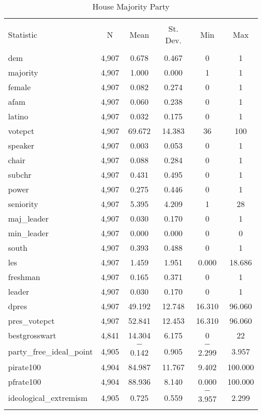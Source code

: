 \documentclass[12pt]{article}
\begin{document}
\begin{table}[ht] \centering 
	\caption{House Majority Party} 
	\label{} 
	\begin{tabular}{@{\extracolsep{5pt}}lccccc} 
		\\[-1.8ex]\hline 
		\hline \\[-1.8ex] 
		Statistic & \multicolumn{1}{c}{N} & \multicolumn{1}{c}{Mean} & \multicolumn{1}{c}{St. Dev.} & \multicolumn{1}{c}{Min} & \multicolumn{1}{c}{Max} \\ 
		\hline \\[-1.8ex] 
		dem & 4,907 & 0.678 & 0.467 & 0 & 1 \\ 
		majority & 4,907 & 1.000 & 0.000 & 1 & 1 \\ 
		female & 4,907 & 0.082 & 0.274 & 0 & 1 \\ 
		afam & 4,907 & 0.060 & 0.238 & 0 & 1 \\ 
		latino & 4,907 & 0.032 & 0.175 & 0 & 1 \\ 
		votepct & 4,907 & 69.672 & 14.383 & 36 & 100 \\ 
		speaker & 4,907 & 0.003 & 0.053 & 0 & 1 \\ 
		chair & 4,907 & 0.088 & 0.284 & 0 & 1 \\ 
		subchr & 4,907 & 0.431 & 0.495 & 0 & 1 \\ 
		power & 4,907 & 0.275 & 0.446 & 0 & 1 \\ 
		seniority & 4,907 & 5.395 & 4.209 & 1 & 28 \\ 
		maj\_leader & 4,907 & 0.030 & 0.170 & 0 & 1 \\ 
		min\_leader & 4,907 & 0.000 & 0.000 & 0 & 0 \\ 
		south & 4,907 & 0.393 & 0.488 & 0 & 1 \\ 
		les & 4,907 & 1.459 & 1.951 & 0.000 & 18.686 \\ 
		freshman & 4,907 & 0.165 & 0.371 & 0 & 1 \\ 
		leader & 4,907 & 0.030 & 0.170 & 0 & 1 \\ 
		dpres & 4,907 & 49.192 & 12.748 & 16.310 & 96.060 \\ 
		pres\_votepct & 4,907 & 52.841 & 12.453 & 16.310 & 96.060 \\ 
		bestgrosswart & 4,841 & 14.304 & 6.175 & 0 & 22 \\ 
		party\_free\_ideal\_point & 4,905 & $-$0.142 & 0.905 & $-$2.299 & 3.957 \\ 
		pirate100 & 4,904 & 84.987 & 11.767 & 9.402 & 100.000 \\ 
		pfrate100 & 4,904 & 88.936 & 8.140 & 0.000 & 100.000 \\ 
		ideological\_extremism & 4,905 & 0.725 & 0.559 & $-$3.957 & 2.299 \\ 
		\hline \\[-1.8ex] 
	\end{tabular} 
\end{table} 
\end{document}
